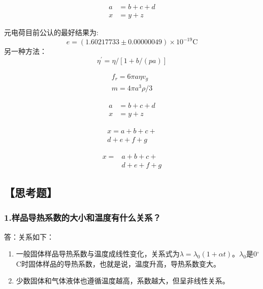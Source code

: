 \documentclass[12pt,a4paper,UTF8]{ctexart}
\begin{document}
		\begin{align}
		a &= b+c+d \\
		x &= y+z
		\end{align}

		元电荷目前公认的最好结果为:
		\[e=(1.60217733 \pm 0.00000049) \times 10^{-19} \mathrm{C}\]
		另一种方法：
		\begin{equation*}
		\eta^{\prime}=\eta /[1+b /(p a)]
		\end{equation*}

		\begin{gather*}
		f_r=6\pi a \eta v_g   \\
		m=4 \pi a^{3} \rho / 3
		\end{gather*}

		\begin{align*}
		a &= b+c+d \\
		x &= y+z
		\end{align*}

		\begin{multline}
		x = a+b+c+{} \\
		d+e+f+g
		\end{multline}

		\[\begin{aligned}
		x ={}&a+b+c+{} \\
		&d+e+f+g
		\end{aligned}\]


\subsection*{【思考题】}

	\subsubsection*{1.样品导热系数的大小和温度有什么关系？}
	答：关系如下：
	\begin{enumerate}[(1)]
			\item 一般固体样品导热系数与温度成线性变化，关系式为$\lambda=\lambda_0(1+\alpha t)$。$\lambda_0$是0$^{\circ}$C时固体样品的导热系数，也就是说，温度升高，导热系数变大。
			\item 少数固体和气体液体也遵循温度越高，系数越大，但呈非线性关系。
	\end{enumerate}
\end{document}
